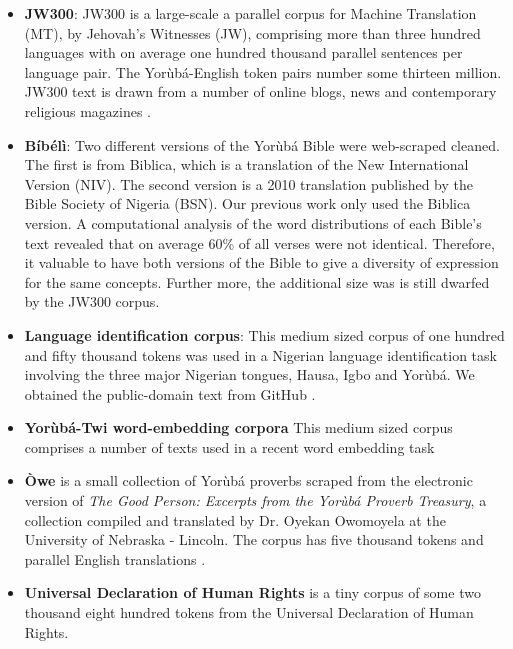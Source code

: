 \documentclass{article} %
\begin{document}
\begin{itemize}

\item \textbf{JW300}: JW300 is a large-scale a parallel corpus for Machine Translation (MT),  by Jehovah's Witnesses (JW), comprising more than three hundred languages with on average one hundred thousand parallel sentences per language pair. The Yor{\`u}b{\'a}-English token pairs number some thirteen million. JW300 text is drawn from a number of online blogs, news and contemporary religious magazines \citep{agic-vulic-2019-jw300}.

\item \textbf{B{\'i}b{\'e}l{\`i}}: Two different versions of the Yor{\`u}b{\'a} Bible were web-scraped cleaned. The first is from Biblica, which is a translation of the New International Version (NIV). The second version is a 2010 translation published by the Bible Society of Nigeria (BSN). Our previous work only used the Biblica version. A computational analysis of the word distributions of each Bible's text revealed that on average 60\% of all verses were not identical. Therefore, it valuable to have both versions of the Bible to give a diversity of expression for the same concepts. Further more, the additional size was is still dwarfed by the JW300 corpus. 

\item \textbf{Language identification corpus}: This medium sized corpus of one hundred and fifty thousand tokens was used in a Nigerian language identification task involving the three major Nigerian tongues, Hausa, Igbo and Yor{\`u}b{\'a}. We obtained the public-domain text from GitHub \citep{Asubiaro_langid}.

\item \textbf{Yor{\`u}b{\'a}-Twi word-embedding corpora}
This medium sized corpus comprises a number of texts used in a recent word embedding task 

\item \textbf{{\`O}we} is a small collection of Yor{\`u}b{\'a} proverbs scraped from the electronic version of \emph{The Good Person: Excerpts from the Yor{\`u}b{\'a} Proverb Treasury}, a collection compiled and translated by Dr. Oyekan Owomoyela at the University of Nebraska - Lincoln. The corpus has five thousand tokens and parallel English translations \citep{oweyoruba}.

\item \textbf{Universal Declaration of Human Rights} is a tiny corpus of some two thousand eight hundred tokens from the Universal Declaration of Human Rights.


\end{itemize}
\end{document}
